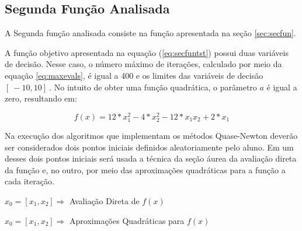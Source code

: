 


\subsection{Segunda Função Analisada}

A Segunda função analisada consiste na função apresentada na seção \ref{sec:secfun}.

A função objetivo apresentada na equação (\ref{eq:secfuntst}) possui duas variáveis de decisão. Nesse caso, o número máximo de iterações, calculado por meio da equação \ref{eq:maxevals}, é igual a 400 e os limites das variáveis de decisão $[\ -10 , 10 ]\ $. No intuito de obter uma função quadrática, o parâmetro $a$ é igual a zero, resultando em:

\begin{equation*} 
    f(x) = 12*x_1^2 - 4*x_2^2 - 12*x_1x_2 + 2*x_1
\end{equation*}

Na execução dos algoritmos que implementam os métodos Quase-Newton deverão ser considerados dois pontos iniciais definidos aleatoriamente pelo aluno. Em um desses dois pontos iniciais será usada a técnica da seção áurea da avaliação direta da função e, no outro, por meio das aproximações quadráticas para a função a cada iteração. 

\begin{minipage}{\linewidth}
    \centering
    $x_0=[x_1,x_2]\Longrightarrow$  Avaliação Direta de $f(x)$
    \label{tab:tble} 
    \writetable{\tble}
    \bigskip
\end{minipage}

\begin{minipage}{\linewidth}
    \centering
    $x_0=[x_1,x_2]\Longrightarrow$  Aproximações Quadráticas para $f(x)$
    \label{tab:tblf} 
    \writetable{\tblf}
    \bigskip
\end{minipage}  
   
